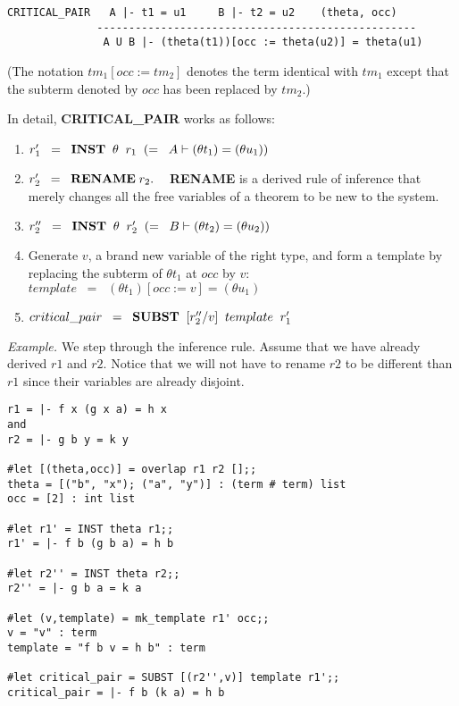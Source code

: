 \begin{verbatim}
CRITICAL_PAIR   A |- t1 = u1     B |- t2 = u2    (theta, occ)
              --------------------------------------------------
               A U B |- (theta(t1))[occ := theta(u2)] = theta(u1)
\end{verbatim}
(The notation $tm_1 [ occ := tm_2 ]$ denotes the term identical with $tm_1$
except that the subterm denoted by $occ$ has been replaced by $tm_2$.)

In detail, {\bf CRITICAL\_PAIR} works as follows:
\begin{enumerate}
\item $r'_1\;\; = \;\;{\bf INST} \;\; \theta \;\; r_1 \;\;(=\;\;A \vdash
(\theta t_1) =(\theta u_1))$
\item $r'_2 \;\; =\;\; {\bf RENAME} \;r_2.\;\;\;$ {\bf RENAME} is a derived rule of
inference that merely changes all the free variables of a theorem to be new to
the system.
\item $r''_2 \;\; = \;\; {\bf INST} \;\; \theta \;\;r'_2 \;\;(=\;\;B
\vdash(\theta t_2) = (\theta u_2))$
\item Generate $v$, a brand new variable of the right type, and form
a template by replacing the subterm of $\theta t_1$ at $occ$ by $v$:  $template \;\;
= \;\;(\theta t_1)[occ := v] = (\theta u_1)$ 
\item $critical\_pair \;\; = \;\; {\bf SUBST}\;\;[r''_2/v]\;\;template\;\;r'_1$
\end{enumerate}

{\em Example. \cite{huet80}} We step through the inference rule. Assume that we have
already derived $r1$ and $r2$. Notice that we will not have to rename $r2$ to
be different than $r1$ since their variables are already disjoint.

\begin{verbatim}
r1 = |- f x (g x a) = h x  
and
r2 = |- g b y = k y

#let [(theta,occ)] = overlap r1 r2 [];;
theta = [("b", "x"); ("a", "y")] : (term # term) list
occ = [2] : int list

#let r1' = INST theta r1;;
r1' = |- f b (g b a) = h b

#let r2'' = INST theta r2;;
r2'' = |- g b a = k a

#let (v,template) = mk_template r1' occ;;
v = "v" : term
template = "f b v = h b" : term

#let critical_pair = SUBST [(r2'',v)] template r1';;
critical_pair = |- f b (k a) = h b
\end{verbatim}

